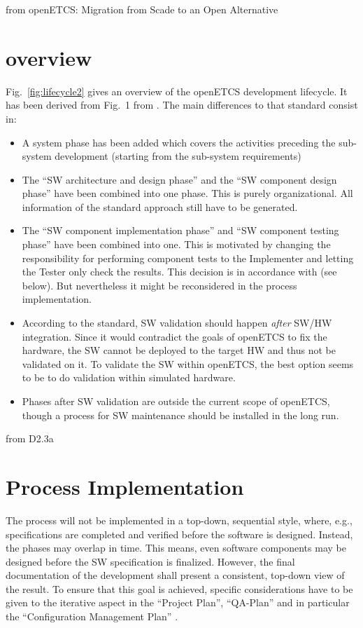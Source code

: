 \documentclass{template/openetcs_report}
\begin{document}
from openETCS: Migration from Scade to an Open Alternative


\section{overview}

Fig.~\ref{fig:lifecycle2} gives an overview of the openETCS
development lifecycle. It has been derived from Fig.~1 from
\cite{EN50128:2011}. The main differences to that standard consist in:
\begin{itemize}
\item A system phase has been added which covers the activities preceding
  the sub-system development (starting from the sub-system requirements)
\item The ``SW architecture and design phase'' and the ``SW component
  design phase'' have been combined into one phase. This is purely
  organizational. All information of the standard approach still have
  to be generated.
\item The ``SW component implementation phase'' and ``SW component
  testing phase'' have been combined into one. This is motivated by
  changing the responsibility for performing component tests to the
  Implementer and letting the Tester only check the results. This
  decision is in accordance with \cite[6.1.4.1 to
  6.1.4.5]{EN50128:2011} (see below). But nevertheless it might be
  reconsidered in the process implementation.
\item According to the standard, SW validation should happen
  \emph{after} SW/HW integration. Since it would contradict the goals
  of openETCS to fix the hardware, the SW cannot be deployed to the
  target HW and thus not be validated on it. To validate the SW within
  openETCS, the best option seems to be to do validation within
  simulated hardware.
\item Phases after SW validation are outside the current scope of
  openETCS, though a process for SW maintenance should be installed in
  the long run.
\end{itemize}

from D2.3a

\section{Process Implementation}
\label{sec:proc-impl}

The process will not be implemented in a top-down, sequential style,
where, e.g., specifications are completed and verified before the
software is designed. Instead, the phases may overlap in time. This
means, even software components may be designed before the SW
specification is finalized. However, the final documentation of the
development shall present a consistent, top-down view of the
result. To ensure that this goal is achieved, specific considerations
have to be given to the iterative aspect in the ``Project Plan'',
``QA-Plan'' and in particular the ``Configuration Management Plan'' .
\end{document}
